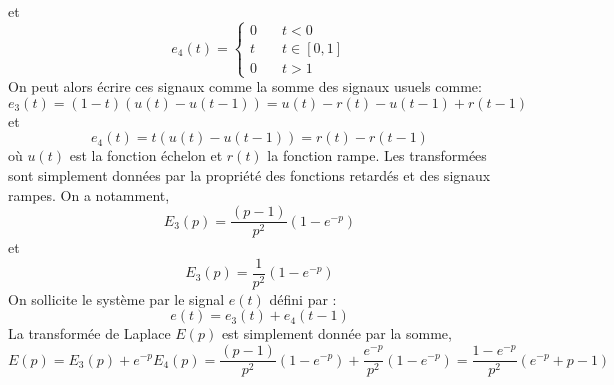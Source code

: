 et
\[
e_4(t)=
\begin{cases}
    0&\quad t<0\\
    t&\quad t\in[0,1]\\
    0&\quad t>1
\end{cases}
\]
On peut alors écrire ces signaux comme la somme des signaux usuels comme:
\[
    e_3(t)=(1-t)\left(u(t)-u(t-1)\right)=u(t)-r(t)-u(t-1)+r(t-1)
\]
et
\[
    e_4(t)=t\left(u(t)-u(t-1)\right)=r(t)-r(t-1)
\]
où $u(t)$ est la fonction échelon et $r(t)$ la fonction rampe.
Les transformées sont simplement données par la propriété des fonctions 
retardés et des signaux rampes. On a notamment,
\[
    E_3(p)=\dfrac{(p-1)}{p^2}\left(1-e^{-p}\right)
\]
et
\[
    E_3(p)=\dfrac{1}{p^2}\left(1-e^{-p}\right)
\]
On sollicite le système par le signal $e(t)$ défini par :
\[
    e(t)=e_3(t)+e_4(t-1)
\]
La transformée de Laplace $E(p)$ est simplement donnée par la somme,
\[
    E(p)=E_3(p)+e^{-p} E_4(p)
        =\dfrac{(p-1)}{p^2}\left(1-e^{-p}\right)+
         \dfrac{e^{-p}}{p^2}\left(1-e^{-p}\right)
        =\dfrac{1-e^{-p}}{p^2}\left(e^{-p}+p-1\right)
\]

